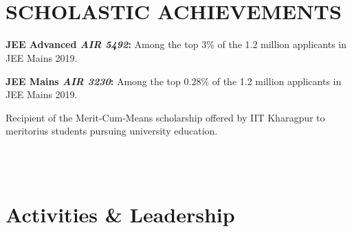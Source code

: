 \documentclass[]{deedy-resume-openfont}
\begin{document}
\begin{minipage}[t]{0.66\textwidth}
\\~\\

\section{SCHOLASTIC ACHIEVEMENTS}

\vspace{\topsep} %
\begin{tightemize}

\item\textbf{{JEE Advanced \emph{AIR 5492}:}} Among the top 3\% of the 1.2 million applicants in JEE Mains 2019.
\vspace{\topsep} %
\item\textbf{{JEE Mains \emph{AIR 3230}:}} Among the top 0.28\% of the 1.2 million applicants in JEE Mains 2019. 
\vspace{\topsep} %
\item Recipient of the Merit-Cum-Means scholarship offered by IIT Kharagpur to meritorius students pursuing university education.
\end{tightemize}

\\~\\


\section{Activities \& Leadership}

\vspace{\topsep} %
\begin{tightemize}



\end{tightemize}
\end{minipage}
\end{document}
